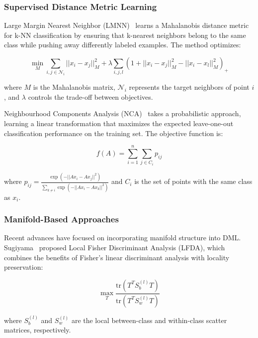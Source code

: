 \documentclass[review]{elsarticle}
\begin{document}
\subsubsection{Supervised Distance Metric Learning}

Large Margin Nearest Neighbor (LMNN)~\cite{weinberger2009distance} learns a Mahalanobis distance metric for k-NN classification by ensuring that k-nearest neighbors belong to the same class while pushing away differently labeled examples. The method optimizes:

\begin{equation}
\min_M \sum_{i,j \in \mathcal{N}_i} ||x_i - x_j||_M^2 + \lambda \sum_{i,j,l} (1 + ||x_i - x_j||_M^2 - ||x_i - x_l||_M^2)_+
\end{equation}

where $M$ is the Mahalanobis matrix, $\mathcal{N}_i$ represents the target neighbors of point $i$, and $\lambda$ controls the trade-off between objectives.

Neighbourhood Components Analysis (NCA)~\cite{goldberger2005neighbourhood} takes a probabilistic approach, learning a linear transformation that maximizes the expected leave-one-out classification performance on the training set. The objective function is:

\begin{equation}
f(A) = \sum_{i=1}^n \sum_{j \in C_i} p_{ij}
\end{equation}

where $p_{ij} = \frac{\exp(-||Ax_i - Ax_j||^2)}{\sum_{k \neq i} \exp(-||Ax_i - Ax_k||^2)}$ and $C_i$ is the set of points with the same class as $x_i$.

\subsubsection{Manifold-Based Approaches}

Recent advances have focused on incorporating manifold structure into DML. Sugiyama~\cite{sugiyama2007dimensionality} proposed Local Fisher Discriminant Analysis (LFDA), which combines the benefits of Fisher's linear discriminant analysis with locality preservation:

\begin{equation}
\max_T \frac{\text{tr}(T^T S_b^{(l)} T)}{\text{tr}(T^T S_w^{(l)} T)}
\end{equation}

where $S_b^{(l)}$ and $S_w^{(l)}$ are the local between-class and within-class scatter matrices, respectively.
\end{document}

